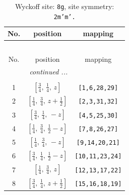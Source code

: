 \documentclass[fleqn,8pt]{jsarticle}
\begin{document}
\begin{longtable}{ccc}
\caption{Wyckoff site: {\tt 8g}, site symmetry: {\tt 2m'm'.}}
 \\
 \hline \hline
No. & position & mapping \\ \hline \endfirsthead

\multicolumn{2}{l}{\tablename\ \thetable{}} \\
 \hline \hline
No. & position & mapping \\ \hline \endhead

 \hline \hline
\multicolumn{2}{r}{\footnotesize\it continued ...} \\ \endfoot

 \hline \hline
\multicolumn{2}{r}{} \\ \endlastfoot

1 & $\left[ \frac{3}{4},\, \frac{1}{4},\, z \right]$ & {\tt [1,6,28,29]} \\ \hline
2 & $\left[ \frac{1}{4},\, \frac{3}{4},\, z + \frac{1}{2} \right]$ & {\tt [2,3,31,32]} \\ \hline
3 & $\left[ \frac{3}{4},\, \frac{1}{4},\, - z \right]$ & {\tt [4,5,25,30]} \\ \hline
4 & $\left[ \frac{1}{4},\, \frac{3}{4},\, \frac{1}{2} - z \right]$ & {\tt [7,8,26,27]} \\ \hline
5 & $\left[ \frac{1}{4},\, \frac{3}{4},\, - z \right]$ & {\tt [9,14,20,21]} \\ \hline
6 & $\left[ \frac{3}{4},\, \frac{1}{4},\, \frac{1}{2} - z \right]$ & {\tt [10,11,23,24]} \\ \hline
7 & $\left[ \frac{1}{4},\, \frac{3}{4},\, z \right]$ & {\tt [12,13,17,22]} \\ \hline
8 & $\left[ \frac{3}{4},\, \frac{1}{4},\, z + \frac{1}{2} \right]$ & {\tt [15,16,18,19]} \\
\end{longtable}
\renewcommand{\arraystretch}{1.2}
\end{document}

